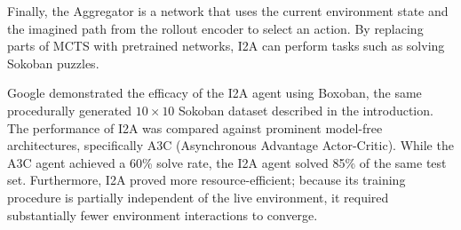 Finally, the Aggregator is a network that uses the current environment state and the imagined path from the rollout encoder to select an action. By replacing parts of MCTS with pretrained networks, I2A can perform tasks such as solving Sokoban puzzles.

Google demonstrated the efficacy of the I2A agent using Boxoban, the same procedurally generated $10\times10$ Sokoban dataset described in the introduction. The performance of I2A was compared against prominent model-free architectures, specifically A3C (Asynchronous Advantage Actor-Critic). While the A3C agent achieved a 60\% solve rate, the I2A agent solved 85\% of the same test set. Furthermore, I2A proved more resource-efficient; because its training procedure is partially independent of the live environment, it required substantially fewer environment interactions to converge.

